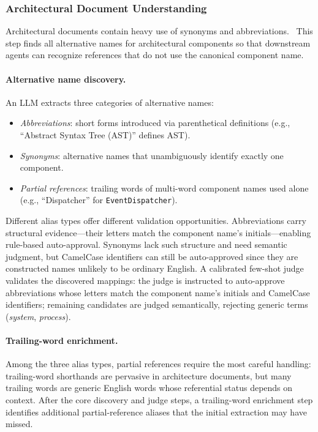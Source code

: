 \subsubsection{Architectural Document Understanding}\label{sec:doc-understanding}

Architectural documents contain heavy use of synonyms and
abbreviations.~
This step finds all alternative names for architectural components
so that downstream agents can recognize references that do not use the
canonical component name.

\paragraph{Alternative name discovery.}
An LLM extracts three categories of alternative names:
\begin{itemize}
    \item \emph{Abbreviations}: short forms introduced via parenthetical
      definitions (e.g., ``Abstract Syntax Tree (AST)'' defines AST).
    \item \emph{Synonyms}: alternative names that unambiguously identify
      exactly one component.
    \item \emph{Partial references}: trailing words of multi-word
      component names used alone (e.g., ``Dispatcher'' for
      \texttt{EventDispatcher}).
\end{itemize}

Different alias types offer different validation opportunities.
Abbreviations carry structural evidence---their letters match the
component name's initials---enabling rule-based auto-approval.
Synonyms lack such structure and need semantic judgment, but
CamelCase identifiers can still be auto-approved since they are
constructed names unlikely to be ordinary English.
A calibrated few-shot judge validates the discovered mappings:
the judge is instructed to auto-approve abbreviations whose letters
match the component name's initials and CamelCase identifiers;
remaining candidates are judged semantically, rejecting generic
terms (\emph{system}, \emph{process}).

\paragraph{Trailing-word enrichment.}
Among the three alias types, partial references require the most
careful handling: trailing-word shorthands are pervasive in
architecture documents, but many trailing words are generic English
words whose referential status depends on context.
After the core discovery and judge steps, a trailing-word enrichment
step identifies additional partial-reference aliases that the initial
extraction may have missed.

